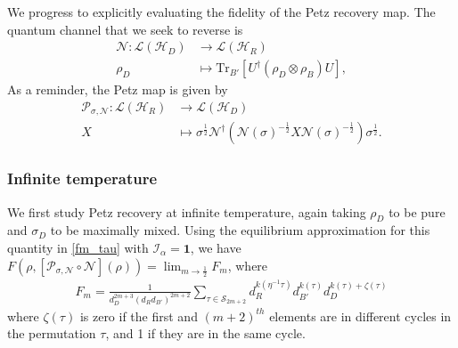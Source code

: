 \documentclass[a4paper,11pt]{article}
\newcommand{\SV}[1]{\textcolor{red}{#1}}
\newcommand\half{{\ensuremath{\frac{1}{2}}}}
\newcommand\al{{\alpha}}
\newcommand\ha{{\half}}
\newcommand\sI{{\ensuremath{{\mathcal I}}}}
\newcommand{\Tr}{\text{Tr}}
\begin{document}
\begin{enumerate}
We progress to explicitly evaluating the fidelity of the Petz recovery map. The quantum channel that we seek to reverse is
\begin{align}
 \mathcal{N}: \mathcal{L}(\mathcal{H}_{D}) &\rightarrow \mathcal{L}(\mathcal{H}_R)
 \nonumber
 \\
 \rho_D &\mapsto \Tr_{B'}\left[ U^{\dagger} \left(\rho_D \otimes \rho_B \right)U \right],
\end{align}
As a reminder, the Petz map is given by 
\begin{align}
 \mathcal{P}_{\sigma,\mathcal{N}}: \mathcal{L}(\mathcal{H}_{R}) &\rightarrow\mathcal{L}(\mathcal{H}_{D}) 
 \nonumber
 \\
 X &\mapsto \sigma^{\frac{1}{2}} \mathcal{N}^{\dagger}\left(\mathcal{N}(\sigma)^{-\frac{1}{2}} X \mathcal{N}(\sigma)^{-\frac{1}{2}}\right)\sigma^{\frac{1}{2}}.
\end{align}


\subsubsection{Infinite temperature}

We first study Petz recovery at infinite temperature, again taking $\rho_D$ to be pure and $\sigma_D$ to be maximally mixed. Using the equilibrium approximation for this quantity in \eqref{fm_tau} with $\sI_{\al}=\mathbf{1}$, we have $ F(\rho , [\mathcal{P}_{\sigma,\mathcal{N}}\circ \mathcal{N}](\rho))= \lim_{m \rightarrow \ha} F_m$, where 
\begin{align}
 F_m %
 = \frac{1}{d_{D}^{2m+3}(d_R d_{B'})^{2m +2}}\sum_{\tau \in \mathcal{S}_{2m + 2}}d_R^{k(\eta^{-1} \tau)} d_{B'}^{k(\tau)} d_D^{k(\tau)+\zeta(\tau)} %
 \label{fmdef}
\end{align}
where $\zeta(\tau)$ is zero if the first and $(m+2)^{th}$ elements are in different cycles in the permutation $\tau$, and 1 if they are in the same cycle.


\end{enumerate}
\end{document}
